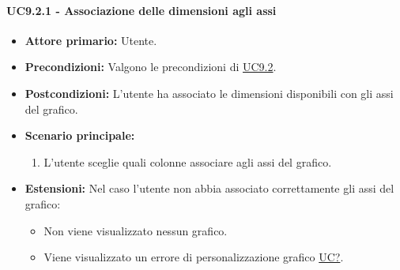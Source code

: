 \paragraph{UC9.2.1 - Associazione delle dimensioni agli assi}
\label{sec:UC9.2.1}
    \begin{itemize}
        \item \textbf{Attore primario:} Utente.
        \item \textbf{Precondizioni:} Valgono le precondizioni di \hyperref[sec:UC9.2]{UC9.2}.
	    \item \textbf{Postcondizioni:} L'utente ha associato le dimensioni disponibili con gli assi del grafico.
	    \item \textbf{Scenario principale:} 
	    \begin{enumerate}
	    		\item L'utente sceglie quali colonne associare agli assi del grafico.
		\end{enumerate}
	    \item \textbf{Estensioni:} Nel caso l'utente non abbia associato correttamente gli assi del grafico:
              \begin{itemize}
                  \item Non viene visualizzato nessun grafico.
                  \item Viene visualizzato un errore di personalizzazione grafico \hyperref[sec:UC - Errore di personalizzazione]{UC?}.
              \end{itemize}
    \end{itemize}



